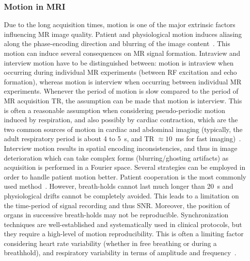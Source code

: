 \subsubsection{Motion in MRI} \label{SubSubSec:IntraviewandInterviewMotion}
Due to the long acquisition times, motion is one of the major extrinsic factors influencing MR image quality. Patient and physiological motion induces aliasing along the phase-encoding direction and blurring of the image content~\cite{Kuestner2022}.
This motion can induce several consequences on MR signal formation. Intraview and interview motion have to be distinguished between: motion is intraview when occurring during individual MR experiments (between RF excitation and echo formation), whereas motion is interview when occurring between individual MR experiments. Whenever the period of motion is slow compared to the period of MR acquisition 
TR, the assumption can be made that motion is interview. This is often a reasonable assumption when considering pseudo-periodic motion induced by respiration, and also possibly by cardiac contraction, which are the two common sources of motion in cardiac and abdominal imaging (typically, the adult respiratory period is about 4 to 5~s, and TR $\approx 10$~ms for fast imaging)~\cite{GRICS}. Interview motion results in spatial encoding inconsistencies, and thus in image deterioration which can take complex forms (blurring/ghosting artifacts) as acquisition is performed in a Fourier space. Several strategies can be employed in order to handle patient motion better. Patient cooperation is the most commonly used method~\cite{GRICS}. However, breath-holds cannot last much longer than 20~s and physiological drifts cannot be completely avoided. This leads to a limitation on the time-period of signal recording and thus SNR. Moreover, the position of organs in successive breath-holds may not be reproducible. Synchronization techniques are well-established and systematically used in clinical protocols, but they require a high-level of motion reproducibility. This is often a limiting factor considering heart rate variability (whether in free breathing or during a breathhold), and respiratory variability in terms of amplitude and frequency~\cite{GRICS}. 

